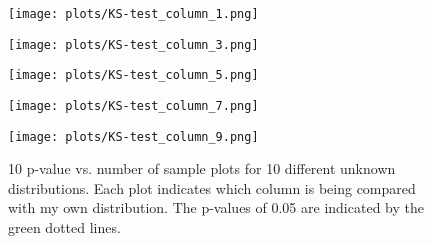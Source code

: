 \begin{figure}[h]
\vspace{-1.3em}
\centering
\texttt{[image: plots/KS-test\_column\_1.png]}
\end{figure}

\vspace{-2.6em}

\begin{figure}[h]
\centering
\texttt{[image: plots/KS-test\_column\_3.png]}
\end{figure}
\begin{figure}[h]
\vspace{-1cm}
\centering
\texttt{[image: plots/KS-test\_column\_5.png]}
\end{figure}
\begin{figure}[h]
\centering
\texttt{[image: plots/KS-test\_column\_7.png]}
\end{figure}
\begin{figure}[h]
\centering
\texttt{[image: plots/KS-test\_column\_9.png]}
\caption{10 p-value vs. number of sample plots for 10 different unknown distributions. Each plot indicates which column is being compared with my own distribution. The p-values of 0.05 are indicated by the green dotted lines.}
\end{figure}

\clearpage